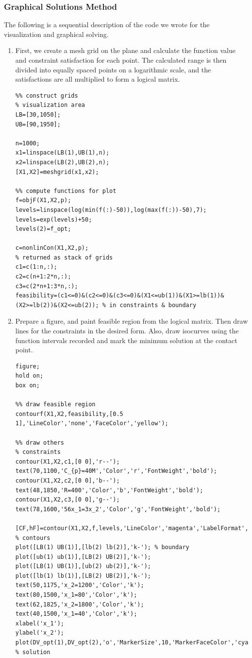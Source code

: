 \documentclass[11pt,twocolumn]{article}
\begin{document}
            \subsubsection{Graphical Solutions Method}
                \label{gsm}
                The following is a sequential description of the code we wrote for the visualization and graphical solving.
                \begin{enumerate}
                    \item First, we create a mesh grid on the plane and calculate the function value and constraint satisfaction for each point. The calculated range is then divided into equally spaced points on a logarithmic scale, and the satisfactions are all multiplied to form a logical matrix.
                    \begin{lstlisting}
%% construct grids
% visualization area
LB=[30,1050];
UB=[90,1950];

n=1000;
x1=linspace(LB(1),UB(1),n);
x2=linspace(LB(2),UB(2),n);
[X1,X2]=meshgrid(x1,x2);

%% compute functions for plot
f=objF(X1,X2,p);
levels=linspace(log(min(f(:)-50)),log(max(f(:))-50),7);
levels=exp(levels)+50;
levels(2)=f_opt;

c=nonlinCon(X1,X2,p);
% returned as stack of grids
c1=c(1:n,:);
c2=c(n+1:2*n,:);
c3=c(2*n+1:3*n,:);
feasibility=(c1<=0)&(c2<=0)&(c3<=0)&(X1<=ub(1))&(X1>=lb(1))&(X2>=lb(2))&(X2<=ub(2)); % in constraints & boundary
                    \end{lstlisting}
                    \item Prepare a figure, and paint feasible region from the logical matrix. Then draw lines for the constraints in the desired form. Also, draw isocurves using the function intervals recorded and mark the minimum solution at the contact point.
                    \begin{lstlisting}[firstnumber=last]
%% ready figure
figure;
hold on;
box on;

%% draw feasible region
contourf(X1,X2,feasibility,[0.5 1],'LineColor','none','FaceColor','yellow');

%% draw others
% constraints
contour(X1,X2,c1,[0 0],'r--');
text(70,1100,'C_{p}=40M','Color','r','FontWeight','bold');
contour(X1,X2,c2,[0 0],'b--');
text(48,1850,'R=400','Color','b','FontWeight','bold');
contour(X1,X2,c3,[0 0],'g--');
text(78,1600,'56x_1=3x_2','Color','g','FontWeight','bold');

[CF,hF]=contour(X1,X2,f,levels,'LineColor','magenta','LabelFormat','f=%.1f'); % contours
plot([LB(1) UB(1)],[lb(2) lb(2)],'k-'); % boundary
plot([ub(1) ub(1)],[LB(2) UB(2)],'k-');
plot([LB(1) UB(1)],[ub(2) ub(2)],'k-');
plot([lb(1) lb(1)],[LB(2) UB(2)],'k-');
text(50,1175,'x_2=1200','Color','k');
text(80,1500,'x_1=80','Color','k');
text(62,1825,'x_2=1800','Color','k');
text(40,1500,'x_1=40','Color','k');
xlabel('x_1');
ylabel('x_2');
plot(DV_opt(1),DV_opt(2),'o','MarkerSize',10,'MarkerFaceColor','cyan','MarkerEdgeColor','k','LineWidth',2); % solution


\end{lstlisting}
\end{enumerate}
\end{document}
